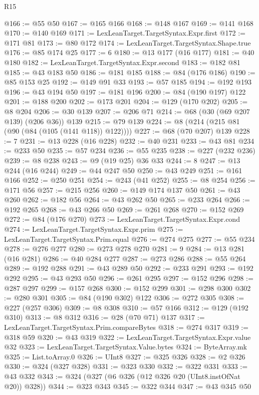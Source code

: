 \begin{lexlean}{R15}
\begin{coremodule}
@166 := @55 @50
@167 := @165 @166
@168 := @148 @167
@169 := @141 @168
@170 := @140 @169
@171 := LexLeanTarget.TargetSyntax.Expr.first
@172 := @171 @81
@173 := @80 @172
@174 := LexLeanTarget.TargetSyntax.Shape.true
@176 := @85 @174 @25
@177 := 6
@180 := @13 @177 (@16 @177)
@181 := @40 @180
@182 := LexLeanTarget.TargetSyntax.Expr.second
@183 := @182 @81
@185 := @43 @183 @50
@186 := @181 @185
@188 := @84 (@176 @186)
@190 := @85 @153 @25
@192 := @149 @91 @33
@193 := @57 @185
@194 := @192 @193
@196 := @43 @194 @50
@197 := @181 @196
@200 := @84 (@190 @197) @122
@201 := @188 @200
@202 := @173 @201
@204 := @129 (@170 @202)
@205 := @8 @204
@206 := @30 @139
@207 := @206 @71
@214 := @68 (@30 (@69 @207 @139) (@206 @36)) @139
@215 := @79 @139
@224 := @8 (@214 (@215 @81 (@90 (@84 (@105 (@141 @118)) @122))))
@227 := @68 (@70 @207) @139
@228 := 7
@231 := @13 @228 (@16 @228)
@232 := @40 @231
@233 := @43 @81
@234 := @233 @50
@235 := @57 @234
@236 := @55 @235
@238 := @227 (@232 @236)
@239 := @8 @238
@243 := @9 (@19 @25) @36 @33
@244 := 8
@247 := @13 @244 (@16 @244)
@249 := @44 @247 @50
@250 := @43 @249
@251 := @161 @166
@252 := @250 @251
@254 := @243 (@41 @252)
@255 := @8 @254
@256 := @171 @56
@257 := @215 @256
@260 := @149 @174 @137 @50
@261 := @43 @260
@262 := @182 @56
@264 := @43 @262 @50
@265 := @233 @264
@266 := @192 @265
@268 := @43 @266 @50
@269 := @261 @268
@270 := @152 @269
@272 := @84 (@176 @270)
@273 := LexLeanTarget.TargetSyntax.Expr.cond
@274 := LexLeanTarget.TargetSyntax.Expr.prim
@275 := LexLeanTarget.TargetSyntax.Prim.equal
@276 := @274 @275
@277 := @55 @234
@278 := @276 @277
@280 := @273 @278 @270
@281 := 9
@284 := @13 @281 (@16 @281)
@286 := @40 @284 @277
@287 := @273 @286
@288 := @55 @264
@289 := @192 @288
@291 := @43 @289 @50
@292 := @233 @291
@293 := @192 @292
@295 := @43 @293 @50
@296 := @261 @295
@297 := @152 @296
@298 := @287 @297
@299 := @157 @268
@300 := @152 @299
@301 := @298 @300
@302 := @280 @301
@305 := @84 (@190 @302) @122
@306 := @272 @305
@308 := @227 (@257 @306)
@309 := @8 @308
@310 := @57 @166
@312 := @129 (@192 @310)
@313 := @8 @312
@316 := @28 (@70 @71) @137
@317 := LexLeanTarget.TargetSyntax.Prim.compareBytes
@318 := @274 @317
@319 := @318 @59
@320 := @43 @319
@322 := LexLeanTarget.TargetSyntax.Expr.value @32
@323 := LexLeanTarget.TargetSyntax.Value.bytes
@324 := ByteArray.mk
@325 := List.toArray.{0}
@326 := UInt8
@327 := @325 @326
@328 := @2 @326
@330 := @324 (@327 @328)
@331 := @323 @330
@332 := @322 @331
@333 := @43 @332
@343 := @324 (@327 (@6 @326 (@12 @326 @20 (UInt8.instOfNat @20)) @328))
@344 := @323 @343
@345 := @322 @344
@347 := @43 @345 @50

\end{coremodule}
\end{lexlean}
